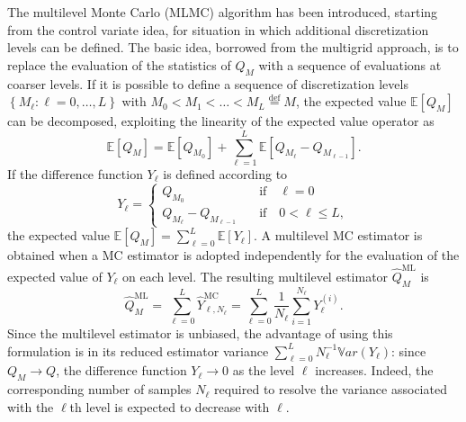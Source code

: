 The multilevel Monte Carlo (MLMC) algorithm has been introduced, starting from the control variate idea, for situation in which additional 
discretization levels can be defined. The basic idea, borrowed from the multigrid approach,
is to replace the evaluation of the statistics of $Q_M$ with a sequence of evaluations at coarser levels. If it is 
possible to define a sequence of discretization levels $\left\{ M_\ell: \ell = 0, \dots, L \right\}$ with 
$M_0 < M_1 < \dots < M_L \stackrel{\mathrm{def}}{=} M$, the expected value $\mathbb{E}\left[{Q_M}\right]$ can be decomposed, 
exploiting the linearity of the expected value operator as
\begin{equation}
 \mathbb{E}\left[{Q_{M}}\right] = \mathbb{E}\left[{Q_{M_0}}\right] + \sum_{\ell = 1}^L \mathbb{E }\left[ Q_{M_{\ell}} - Q_{M_{\ell-1}} \right].
\end{equation}
If the difference function $Y_\ell$ is defined according to
\begin{equation}
 Y_\ell = \left\{
 \begin{split}
 Q_{M_0} \quad &\mathrm{if} \quad \ell=0 \\
 Q_{M_{\ell}} - Q_{M_{\ell-1}} \quad &\mathrm{if} \quad 0<\ell\leq L,
 \end{split}
 \right.
\end{equation}
the expected value $\mathbb{E}\left[{Q_M}\right]=\sum_{\ell=0}^{L}{  \mathbb{E}\left[Y_\ell\right]   }$. A multilevel MC estimator is obtained 
when a MC estimator is adopted independently for the evaluation of the expected value of $Y_\ell$ on each level. The resulting multilevel 
estimator $\hat{Q}_M^{\mathrm{ML}}$ is 
\begin{equation}
 \hat{Q}_M^{\mathrm{ML}} = \, \sum_{\ell = 0}^L \hat{Y}_{\ell, N_\ell}^{\mathrm{MC}} 
 = \sum_{\ell = 0}^L \frac{1}{N_\ell} \sum_{i=1}^{N_\ell} Y_\ell^{(i)}.
\end{equation}
Since the multilevel estimator is unbiased, the advantage of using this formulation is in its reduced estimator variance 
$\sum_{\ell=0}^{L} N_\ell^{-1} \mathbb{V}ar\left({Y_\ell}\right)$: since $Q_M \rightarrow Q$, 
the difference function $Y_\ell \rightarrow 0$ as the level $\ell$ increases. Indeed, the corresponding number of
samples $N_\ell$ required to resolve the variance associated with the $\ell$th level is expected 
to decrease with $\ell$.
 
